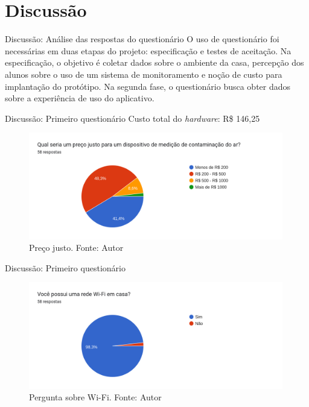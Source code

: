 \documentclass[12pt]{beamer}
\begin{document}
    \section{Discussão}

    \begin{frame}{Discussão: Análise das respostas do questionário}
        O uso de questionário foi necessárias em duas etapas do projeto: especificação e testes 
        de aceitação. Na especificação, o objetivo é coletar dados sobre o ambiente da casa, percepção dos 
        alunos sobre o uso de um sistema de monitoramento e noção de custo para implantação do protótipo.
        Na segunda fase, o questionário busca obter dados sobre a experiência de uso do aplicativo.
    \end{frame}

    \begin{frame}{Discussão: Primeiro questionário}   
        Custo total do \textit{hardware}: R\$ 146,25
        
        \begin{figure}[ht]
            \centering
            \includegraphics[width=0.99\textwidth]{./img/grafico-preco-hardware.png}
            \caption{Preço justo. Fonte: Autor}\label{fig:precoJusto}
        \end{figure}
    \end{frame}

    \begin{frame}{Discussão: Primeiro questionário}        
        \begin{figure}[ht]
            \centering
            \includegraphics[width=0.99\textwidth]{./img/questionario-wifi.png}
            \caption{Pergunta sobre Wi-Fi. Fonte: Autor}\label{fig:wifi}
        \end{figure}
    \end{frame}
\end{document}
